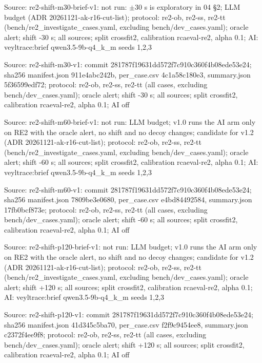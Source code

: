 \noindent Source: re2-shift-m30-brief-v1: not run: $\pm$30 s is exploratory in 04 \S{}2; LLM budget (ADR 20261121-ak-r16-cut-list); protocol: re2-ob, re2-ss, re2-tt (bench/\allowbreak{}re2\_investigate\_cases.yaml, excluding bench/\allowbreak{}dev\_cases.yaml); oracle alert; shift -30 s; all sources; split crossfit2, calibration rcaeval-re2, alpha 0.1; AI: veyltrace:brief qwen3.5-9b-q4\_k\_m seeds 1,2,3\par
\noindent Source: re2-shift-m30-v1: commit 281787f19631dd572f7c910c360f4b08ede53e24; sha256 manifest.json 911e4abc242b, per\_case.csv 4c1a58c180e3, summary.json 5f36599edf72; protocol: re2-ob, re2-ss, re2-tt (all cases, excluding bench/\allowbreak{}dev\_cases.yaml); oracle alert; shift -30 s; all sources; split crossfit2, calibration rcaeval-re2, alpha 0.1; AI off\par
\noindent Source: re2-shift-m60-brief-v1: not run: LLM budget; v1.0 runs the AI arm only on RE2 with the oracle alert, no shift and no decoy changes; candidate for v1.2 (ADR 20261121-ak-r16-cut-list); protocol: re2-ob, re2-ss, re2-tt (bench/\allowbreak{}re2\_investigate\_cases.yaml, excluding bench/\allowbreak{}dev\_cases.yaml); oracle alert; shift -60 s; all sources; split crossfit2, calibration rcaeval-re2, alpha 0.1; AI: veyltrace:brief qwen3.5-9b-q4\_k\_m seeds 1,2,3\par
\noindent Source: re2-shift-m60-v1: commit 281787f19631dd572f7c910c360f4b08ede53e24; sha256 manifest.json 7809be3e0680, per\_case.csv e4bd84492584, summary.json 17fb0bcf873e; protocol: re2-ob, re2-ss, re2-tt (all cases, excluding bench/\allowbreak{}dev\_cases.yaml); oracle alert; shift -60 s; all sources; split crossfit2, calibration rcaeval-re2, alpha 0.1; AI off\par
\noindent Source: re2-shift-p120-brief-v1: not run: LLM budget; v1.0 runs the AI arm only on RE2 with the oracle alert, no shift and no decoy changes; candidate for v1.2 (ADR 20261121-ak-r16-cut-list); protocol: re2-ob, re2-ss, re2-tt (bench/\allowbreak{}re2\_investigate\_cases.yaml, excluding bench/\allowbreak{}dev\_cases.yaml); oracle alert; shift +120 s; all sources; split crossfit2, calibration rcaeval-re2, alpha 0.1; AI: veyltrace:brief qwen3.5-9b-q4\_k\_m seeds 1,2,3\par
\noindent Source: re2-shift-p120-v1: commit 281787f19631dd572f7c910c360f4b08ede53e24; sha256 manifest.json 41d345c5ba70, per\_case.csv f2f9c9454ee8, summary.json c2372f4ee9f8; protocol: re2-ob, re2-ss, re2-tt (all cases, excluding bench/\allowbreak{}dev\_cases.yaml); oracle alert; shift +120 s; all sources; split crossfit2, calibration rcaeval-re2, alpha 0.1; AI off\par

